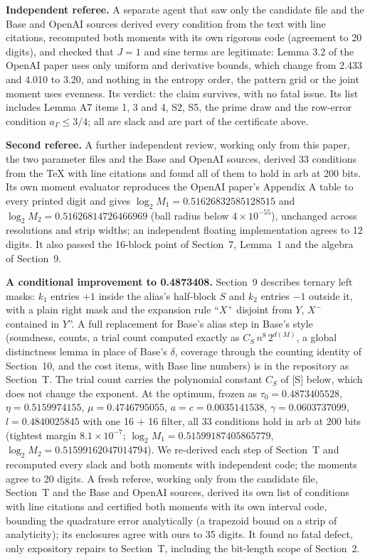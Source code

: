 \documentclass[11pt]{article}
\theoremstyle{plain}
\begin{document}
\textbf{Independent referee.} A separate agent that saw only the candidate file and the Base and OpenAI sources derived every condition from the text with line citations, recomputed both moments with its own rigorous code (agreement to 20 digits), and checked that $J = 1$ and sine terms are legitimate: Lemma 3.2 of the OpenAI paper uses only uniform and derivative bounds, which change from 2.433 and 4.010 to 3.20, and nothing in the entropy order, the pattern grid or the joint moment uses evenness. Its verdict: the claim survives, with no fatal issue. Its list includes Lemma A7 items 1, 3 and 4, S2, S5, the prime draw and the row-error condition $a_\Gamma \le 3/4$; all are slack and are part of the certificate above.

\textbf{Second referee.} A further independent review, working only from this paper, the two parameter files and the Base and OpenAI sources, derived 33 conditions from the TeX with line citations and found all of them to hold in arb at 200 bits. Its own moment evaluator reproduces the OpenAI paper's Appendix A table to every printed digit and gives $\log_2 M_1 = 0.51626832585128515$ and $\log_2 M_2 = 0.51626814726466969$ (ball radius below $4\times10^{-55}$), unchanged across resolutions and strip widths; an independent floating implementation agrees to 12 digits. It also passed the 16-block point of Section~7, Lemma~1 and the algebra of Section~9.

\textbf{A conditional improvement to 0.4873408.} Section~9 describes ternary left masks: $k_1$ entries $+1$ inside the alias's half-block $S$ and $k_2$ entries $-1$ outside it, with a plain right mask and the expansion rule ``$X^+$ disjoint from $Y$, $X^-$ contained in $Y$''. A full replacement for Base's alias step in Base's style (soundness, counts, a trial count computed exactly as $C_S\, n^8\, 2^{d(M)}$, a global distinctness lemma in place of Base's $\delta$, coverage through the counting identity of Section~10, and the cost items, with Base line numbers) is in the repository as Section~T. The trial count carries the polynomial constant $C_S$ of [S] below, which does not change the exponent. At the optimum, frozen as $\tau_0 = 0.4873405528$, $\eta = 0.5159974155$, $\mu = 0.4746795055$, $a = c = 0.0035141538$, $\gamma = 0.0603737099$, $l = 0.4840025845$ with one 16 + 16 filter, all 33 conditions hold in arb at 200 bits (tightest margin $8.1\times10^{-7}$; $\log_2 M_1 = 0.51599187405865779$, $\log_2 M_2 = 0.51599162047014794$). We re-derived each step of Section~T and recomputed every slack and both moments with independent code; the moments agree to 20 digits. A fresh referee, working only from the candidate file, Section~T and the Base and OpenAI sources, derived its own list of conditions with line citations and certified both moments with its own interval code, bounding the quadrature error analytically (a trapezoid bound on a strip of analyticity); its enclosures agree with ours to 35 digits. It found no fatal defect, only expository repairs to Section~T, including the bit-length scope of Section~2.
\end{document}
